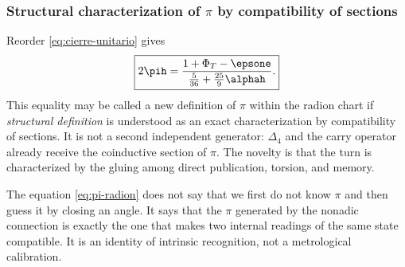 \subsubsection{Structural characterization of \(\pi\) by compatibility of sections}

Reorder \eqref{eq:cierre-unitario} gives
\begin{equation}
\boxed{
2\pih=
\frac{1+\Phi_T-\epsone}
{\frac5{36}+\frac{25}{9}\alphah}.}
\label{eq:pi-radion}
\end{equation}
This equality may be called a new definition of \(\pi\) within the
radion chart if \emph{structural definition} is understood as an
exact characterization by compatibility of sections. It is not a second
independent generator: \(\Delta_4\) and the carry operator already receive the
coinductive section of \(\pi\). The novelty is that the turn is
characterized by the gluing among direct publication, torsion, and memory.

\begin{narrativebox}
The equation \eqref{eq:pi-radion} does not say that we first do not know \(\pi\) and then guess it by closing an angle. It says that the \(\pi\) generated by the nonadic connection is exactly the one that makes two internal readings of the same state compatible. It is an identity of intrinsic recognition, not a metrological calibration.
\end{narrativebox}
